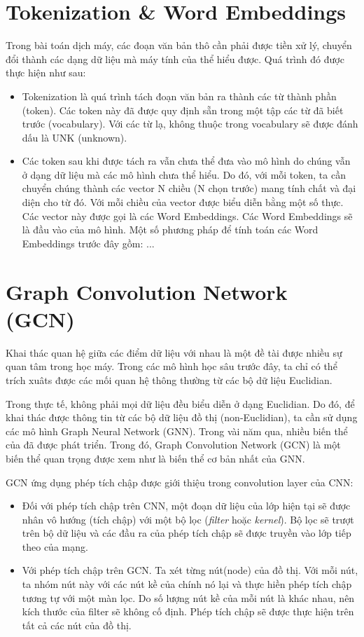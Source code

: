 \section{Tokenization \& Word Embeddings}

Trong bài toán dịch máy, các đoạn văn bản thô cần phải được tiền xử lý, chuyển đổi thành các dạng dữ liệu mà máy tính của thể hiểu được. Quá trình đó được thực hiện như sau:
\begin{itemize}
	\item Tokenization là quá trình tách đoạn văn bản ra thành các từ thành phần (token). Các token này đã được quy định sẵn trong một tập các từ đã biết trước (vocabulary). Với các từ lạ, không thuộc trong vocabulary sẽ được đánh dấu là UNK (unknown).
	\item Các token sau khi được tách ra vẫn chưa thể đưa vào mô hình do chúng vẫn ở dạng dữ liệu mà các mô hình chưa thể hiểu. Do đó, với mỗi token, ta cần chuyển chúng thành các vector N chiều (N chọn trước) mang tính chất và đại diện cho từ đó. Với mỗi chiều của vector được biểu diễn bằng một số thực. Các vector này được gọi là các Word Embeddings. Các Word Embeddings sẽ là đầu vào của mô hình. Một số phương pháp để tính toán các Word Embeddings trước đây gồm: ...
\end{itemize}

\section{Graph Convolution Network (GCN)}
Khai thác quan hệ giữa các điểm dữ liệu với nhau là một đề tài được nhiều sự quan tâm trong học máy. Trong các mô hình học sâu trước đây, ta chỉ có thể trích xuâts được các mối quan hệ thông thường từ các bộ dữ liệu Euclidian. 

Trong thực tế, không phải mọi dữ liệu đều biểu diễn ở dạng Euclidian. Do đó, để khai thác được thông tin từ các bộ dữ liệu đồ thị (non-Euclidian), ta cần sử dụng các mô hình Graph Neural Network (GNN). Trong vài năm qua, nhiều biến thể của đã được phát triển. Trong đó, Graph Convolution Network (GCN) là một biến thể quan trọng được xem như là biến thể cơ bản nhất của GNN.

GCN ứng dụng phép tích chập được giới thiệu trong convolution layer của CNN:
\begin{itemize}
	\item Đối với phép tích chập trên CNN, một đoạn dữ liệu của lớp hiện tại sẽ được nhân vô hướng (tích chập) với một bộ lọc (\textit{filter} hoặc \textit{kernel}). Bộ lọc sẽ trượt trên bộ dữ liệu và các đầu ra của phép tích chập sẽ được truyền vào lớp tiếp theo của mạng.
	\item Với phép tích chập trên GCN. Ta xét từng nút(node) của đồ thị. Với mỗi nút, ta nhóm nút này với các nút kề của chính nó lại và thực hiền phép tích chập tương tự với một màn lọc. Do số lượng nút kề của mỗi nút là khác nhau, nên kích thước của filter sẽ không cố định. Phép tích chập sẽ được thực hiện trên tất cả các nút của đồ thị.
\end{itemize}

